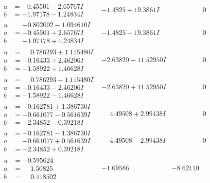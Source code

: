 \documentclass[1p]{elsarticle_modified}
\theoremstyle{definition}
\begin{document}
$$\begin{array}{c|c|c}
\begin{aligned}
a &= -0.45501 - 2.65767 I \\
b &= -1.97178 - 1.24834 I\end{aligned}
 & -1.4825 + 19.3861 I & \phantom{-0.000000 } 0 \\ \hline\begin{aligned}
u &= -0.802002 - 1.094610 I \\
a &= -0.45501 + 2.65767 I \\
b &= -1.97178 + 1.24834 I\end{aligned}
 & -1.4825 - 19.3861 I & \phantom{-0.000000 } 0 \\ \hline\begin{aligned}
u &= \phantom{-}0.786293 + 1.115480 I \\
a &= -0.16433 + 2.46206 I \\
b &= -1.58922 + 1.46628 I\end{aligned}
 & -2.63820 - 11.52950 I & \phantom{-0.000000 } 0 \\ \hline\begin{aligned}
u &= \phantom{-}0.786293 - 1.115480 I \\
a &= -0.16433 - 2.46206 I \\
b &= -1.58922 - 1.46628 I\end{aligned}
 & -2.63820 + 11.52950 I & \phantom{-0.000000 } 0 \\ \hline\begin{aligned}
u &= -0.162781 + 1.386730 I \\
a &= -0.661077 - 0.561639 I \\
b &= -2.34852 - 0.39218 I\end{aligned}
 & \phantom{-}4.49508 + 2.99438 I & \phantom{-0.000000 } 0 \\ \hline\begin{aligned}
u &= -0.162781 - 1.386730 I \\
a &= -0.661077 + 0.561639 I \\
b &= -2.34852 + 0.39218 I\end{aligned}
 & \phantom{-}4.49508 - 2.99438 I & \phantom{-0.000000 } 0 \\ \hline\begin{aligned}
u &= -0.595624\phantom{ +0.000000I} \\
a &= \phantom{-}1.50825\phantom{ +0.000000I} \\
b &= \phantom{-}0.418502\phantom{ +0.000000I}\end{aligned}
 & -1.09586\phantom{ +0.000000I} & -8.62110\phantom{ +0.000000I} \\ \hline\begin{aligned}

\end{aligned}
\end{array}$$
\end{document}
